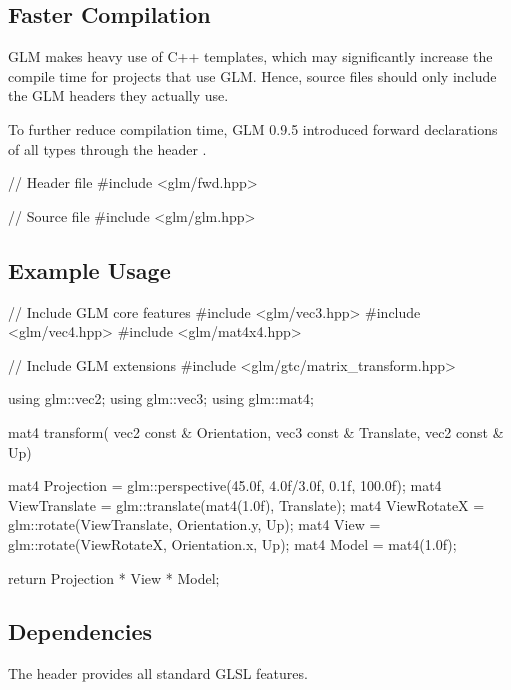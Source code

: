 \documentclass{scrartcl}
\numberwithin{figure}{subsection}
\begin{document}
\subsection{Faster Compilation}
GLM makes heavy use of C++ templates, which may significantly increase the compile time for projects that use GLM.  Hence, source files should only include the GLM headers they actually use.

To further reduce compilation time, GLM 0.9.5 introduced forward declarations of all types through the header .

\begin{cppcode}
// Header file
#include <glm/fwd.hpp>
\end{cppcode}

\begin{cppcode}
// Source file
#include <glm/glm.hpp>
\end{cppcode}

\subsection{Example Usage}

\begin{cppcode}
// Include GLM core features
#include <glm/vec3.hpp>
#include <glm/vec4.hpp>
#include <glm/mat4x4.hpp>

// Include GLM extensions
#include <glm/gtc/matrix_transform.hpp>

using glm::vec2;
using glm::vec3;
using glm::mat4;

mat4 transform(
  vec2 const & Orientation, 
  vec3 const & Translate,
  vec2 const & Up)
{
  mat4 Projection = glm::perspective(45.0f, 4.0f/3.0f, 0.1f, 100.0f);
  mat4 ViewTranslate = glm::translate(mat4(1.0f), Translate);
  mat4 ViewRotateX = glm::rotate(ViewTranslate, Orientation.y, Up);
  mat4 View = glm::rotate(ViewRotateX, Orientation.x, Up);
  mat4 Model = mat4(1.0f);
        
  return Projection * View * Model;
}
\end{cppcode}


\subsection{Dependencies}

The  header provides all standard GLSL features.
\end{document}
